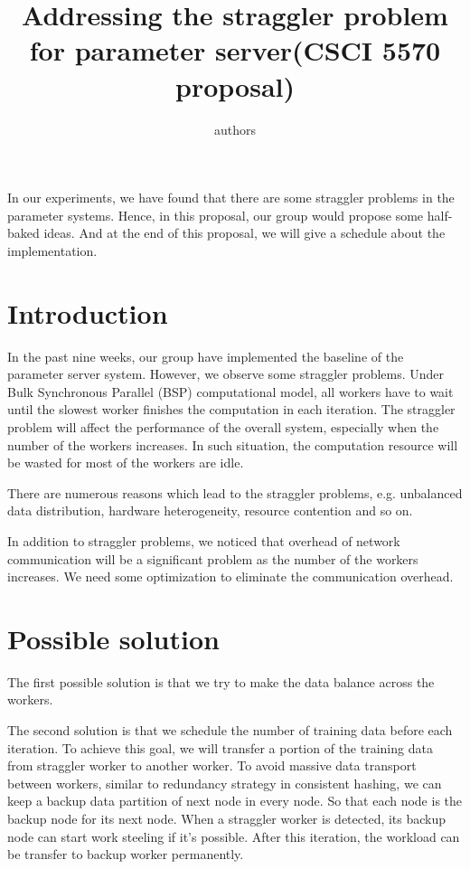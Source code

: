 \documentclass{article}
\begin{document}
\newcommand{\stitle}[1]{\vspace{0.4ex}\noindent{\bf #1}}

\title{Addressing the straggler problem for parameter server(CSCI 5570 proposal)}
\author{authors}

\maketitle

\noindent In our experiments, we have found that there are some straggler problems in the parameter systems. Hence, in this proposal, our group would propose some half-baked ideas. And at the end of this proposal, we will give a schedule about the implementation.

\section{Introduction}

\noindent In the past nine weeks, our group have implemented the baseline of the parameter server system. However, we observe some straggler problems. Under Bulk Synchronous Parallel (BSP) computational model, all workers have to wait until the slowest worker finishes the computation in each iteration. The straggler problem will affect the performance of the overall system, especially when the number of the workers increases. In such situation, the computation resource will be wasted for most of the workers are idle.

\noindent There are numerous reasons which lead to the straggler problems, e.g. unbalanced data distribution, hardware heterogeneity, resource contention and so on.

\noindent In addition to straggler problems, we noticed that overhead of network communication will be a significant problem as the number of the workers increases. We need some optimization to eliminate the communication overhead.

\section{Possible solution}

\noindent The first possible solution is that we try to make the data balance across the workers.

\noindent The second solution is that we schedule the number of training data before each iteration. To achieve this goal, we will transfer a portion of the training data from straggler worker to another worker. To avoid massive data transport between workers, similar to redundancy strategy in consistent hashing, we can keep a backup data partition of next node in every node. So that each node is the backup node for its next node. When a straggler worker is detected, its backup node can start work steeling if it’s possible. After this iteration, the workload can be transfer to backup worker permanently.
\end{document}

